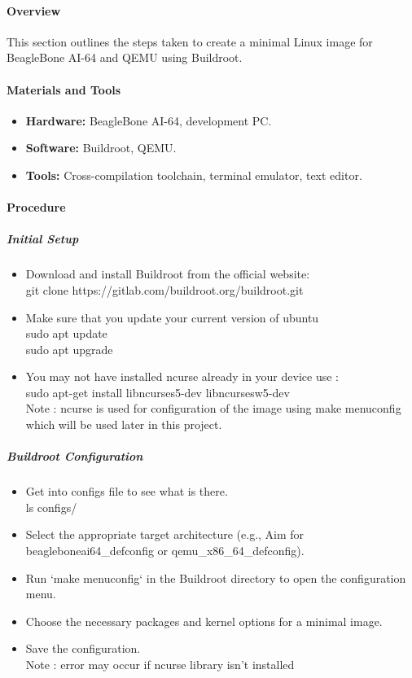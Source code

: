 \paragraph{Overview}
This section outlines the steps taken to create a minimal Linux image for BeagleBone AI-64 and QEMU using Buildroot.

\paragraph{Materials and Tools}
\begin{itemize}
    \item \textbf{Hardware:} BeagleBone AI-64, development PC.
    \item \textbf{Software:} Buildroot, QEMU.
    \item \textbf{Tools:} Cross-compilation toolchain, terminal emulator, text editor.
\end{itemize}

\paragraph{Procedure}
\subparagraph{Initial Setup}
\begin{itemize}
    \item Download and install Buildroot from the official website: \\
     git clone https://gitlab.com/buildroot.org/buildroot.git
    \item Make sure that you update your current version of ubuntu \\
    sudo apt update \\
    sudo apt upgrade 
    \item You may not have installed ncurse already in your device use :\\
    sudo apt-get install libncurses5-dev libncursesw5-dev\\
    Note : ncurse is used for configuration of the image using make menuconfig which will be used later in this project.
      
\end{itemize}

\subparagraph{Buildroot Configuration}
\begin{itemize}
    \item Get into configs file to see what is there.\\
    ls configs/
    \item Select the appropriate target architecture (e.g., Aim for beagleboneai64\_defconfig or qemu\_x86\_64\_defconfig).
    \item Run `make menuconfig` in the Buildroot directory to open the configuration menu.
    \item Choose the necessary packages and kernel options for a minimal image.
    \item Save the configuration.\\
    Note : error may occur if ncurse library isn’t installed 
    
\end{itemize}
\noindent \\
        
